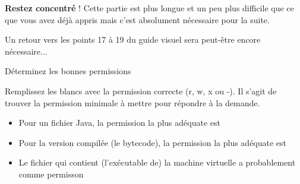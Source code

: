 \documentclass[a4paper,11pt]{article}
\begin{document}
\par
\textbf{Restez concentr\'e} ! 
Cette partie est plus longue et un peu plus difficile que ce que vous avez d\'ej\`a appris 
mais c'est absolument n\'ecessaire pour la suite.   
\par

Un retour vers les points 17 \`a 19 du guide visuel sera peut-\^etre encore n\'ecessaire...  

\par

\begin{Exercice}{D\'eterminez les bonnes permissions}
	
	Remplissez les blancs avec la permission correcte (r, w, x ou -). 
	Il s'agit de trouver la permission minimale \`a mettre pour r\'epondre \`a la demande.   
	
	\begin{itemize}
		
		\item 
		Pour un fichier Java, la permission la plus ad\'equate est
		\textcolor{gray}{\underline{\hspace*{1em}}}  \textcolor{gray}{\underline{\hspace*{1em}}}  \textcolor{gray}{\underline{\hspace*{1em}}} 
		\item 
		Pour la version compil\'ee (le bytecode), la permission la plus ad\'equate est
		\textcolor{gray}{\underline{\hspace*{1em}}}  \textcolor{gray}{\underline{\hspace*{1em}}}  \textcolor{gray}{\underline{\hspace*{1em}}} 
		\item 
		Le fichier qui contient (l'ex\'ecutable de) la machine virtuelle a probablement comme permisson
		\textcolor{gray}{\underline{\hspace*{1em}}}  \textcolor{gray}{\underline{\hspace*{1em}}}  \textcolor{gray}{\underline{\hspace*{1em}}} 
	\end{itemize}
	
\end{Exercice}
\end{document}
